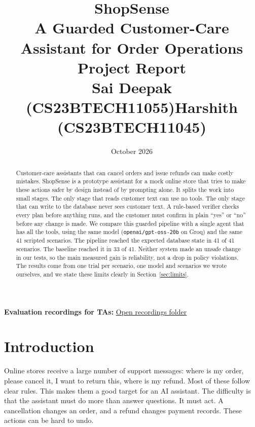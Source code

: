 \documentclass[11pt,a4paper]{article}
\title{\vspace{-2.4cm}\textbf{ShopSense}\\[6pt]
       \large A Guarded Customer-Care Assistant for Order Operations\\[4pt]
       \normalsize Project Report\\[9pt]
       Sai Deepak (CS23BTECH11055)\quad Harshith (CS23BTECH11045)}
\author{}
\date{October 2026}
\begin{document}
\maketitle
\begin{center}
\small\textbf{Evaluation recordings for TAs:} \href{https://drive.google.com/drive/folders/1kxtCOCa9T6eWW9WEGTdjKTHUjnvW6C_Z?usp=drive_link}{\textcolor{customblue}{\underline{Open recordings folder}}}
\end{center}
\vspace{-0.5cm}

\begin{abstract}
\noindent Customer-care assistants that can cancel orders and issue refunds can make costly mistakes. ShopSense is a prototype assistant for a mock online store that tries to make these actions safer by design instead of by prompting alone. It splits the work into small stages. The only stage that reads customer text can use no tools. The only stage that can write to the database never sees customer text. A rule-based verifier checks every plan before anything runs, and the customer must confirm in plain ``yes'' or ``no'' before any change is made. We compare this guarded pipeline with a single agent that has all the tools, using the same model (\texttt{openai/gpt-oss-20b} on Groq) and the same 41 scripted scenarios. The pipeline reached the expected database state in 41 of 41 scenarios. The baseline reached it in 33 of 41. Neither system made an unsafe change in our tests, so the main measured gain is reliability, not a drop in policy violations. The results come from one trial per scenario, one model and scenarios we wrote ourselves, and we state these limits clearly in Section~\ref{sec:limits}.
\end{abstract}

%

\section{Introduction}
Online stores receive a large number of support messages: where is my order, please cancel it, I want to return this, where is my refund. Most of these follow clear rules. This makes them a good target for an AI assistant. The difficulty is that the assistant must do more than answer questions. It must act. A cancellation changes an order, and a refund changes payment records. These actions can be hard to undo.
\end{document}
